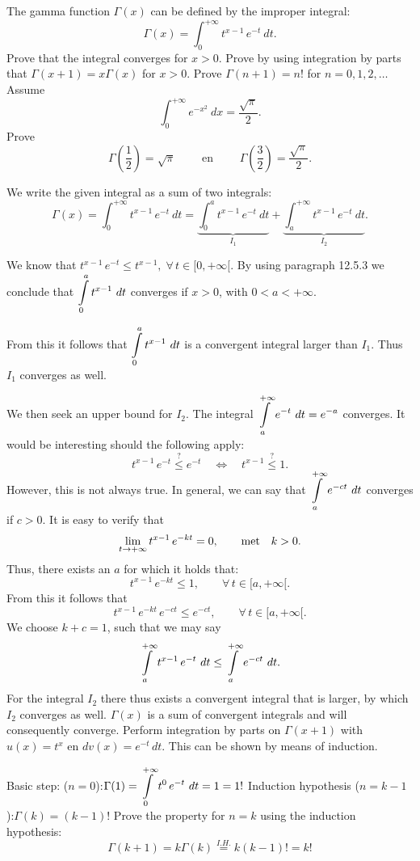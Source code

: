 \ifanalysis
\begin{Exercise}[difficulty = 3]
The gamma function $\Gamma(x)$ can be defined by the improper integral:
\[ \Gamma(x) = \int_0^{+\infty} t^{x-1}\, e^{-t}\ dt. \]
	\Question Prove that the integral converges for $x>0$.
	\Question Prove by using integration by parts that $\Gamma(x+1) = x\Gamma(x)$ for $x>0$.
	\Question Prove $\Gamma(n+1)=n!$ for $n=0,1,2,\ldots$
	\Question Assume
	\[ \int_0^{+\infty} e^{-x^2}\ dx = \dfrac{\sqrt{\pi}}{2}. \]
	Prove
	\[ \Gamma\left(\dfrac{1}{2}\right) = \sqrt{\pi}\qquad \text{ en }\qquad \Gamma\left(\dfrac{3}{2}\right) = \dfrac{\sqrt{\pi}}{2}. \]
\end{Exercise}

\begin{Answer}
    
    \Question We write the given integral as a sum of two integrals:
    \[ \Gamma(x) = \int_0^{+\infty} t^{x-1}\, e^{-t}\ dt = \underbrace{\int_0^{a} t^{x-1}\, e^{-t}\ dt}_{I_1} + \underbrace{\int_a^{+\infty} t^{x-1}\, e^{-t}\ dt}_{I_2} . \]
    
     We know that $t^{x-1}\, e^{-t} \leq t^{x-1},\; \forall\, t\in [0,+\infty[$. By using paragraph 12.5.3 we conclude that $\displaystyle \int \limits_0^{a} t^{x-1}\ dt$ converges if $x>0$, with $0<a<+\infty$.
    
    From this it follows that $\displaystyle \int \limits_0^{a} t^{x-1}\ dt$ is a convergent integral larger than $I_1$. Thus $I_1$ converges as well.
    \par
    We then seek an upper bound for $I_2$. The integral $\displaystyle \int \limits_a^{+\infty} e^{-t}\ dt = e^{-a}$ converges. It would be interesting should the following apply:
    \[ t^{x-1}\, e^{-t} \stackrel{?}{\leq} e^{-t}\quad \Leftrightarrow\quad t^{x-1}\stackrel{?}{\leq} 1.\]
    However, this is not always true. In general, we can say that $\displaystyle\int \limits_a^{+\infty} e^{-ct}\ dt$ converges if $c>0$. It is easy to verify that
    \[ \displaystyle\lim_{t\to +\infty} t^{x-1}\, e^{-kt} = 0,\qquad\mbox{met}\quad k>0.\]  
    Thus, there exists an $a$ for which it holds  that:
    \[ t^{x-1}\, e^{-kt} \leq 1,\qquad \forall\, t\in [a,+\infty[.\]
    From this it follows that
    \[t^{x-1}\, e^{-kt}\, e^{-ct} \leq e^{-ct},\qquad \forall\, t\in [a,+\infty[.\]
    We  choose $k+c=1$, such that we may say
    \[\displaystyle \int\limits_a^{+\infty} t^{x-1}\, e^{-t}\ dt \leq \displaystyle \int\limits_a^{+\infty} e^{-ct}\ dt. \]
    For the integral $I_2$ there thus exists a convergent integral that is larger, by which $I_2$ converges as well. $\Gamma(x)$ is a sum of convergent integrals and will consequently converge.
    \Question  Perform integration by parts on $\Gamma(x+1)$ with $u(x)=t^x$ en $dv(x)=e^{-t}\, dt$.
    \Question This can be shown by means of induction. 
    \begin{itemize}
    \Question Basic step: ($n=0$):\quad $\Gamma(1) = \displaystyle \int \limits_0^{+\infty} t^{0}\, e^{-t}\ dt =1 =1!$
    \Question Induction hypothesis ($n=k-1$):\quad $\Gamma(k)=(k-1)!$
    \Question Prove the property for $n=k$ using the induction hypothesis: 
    $$\Gamma(k+1) = k\Gamma(k) \stackrel{I.H.}{=} k (k-1)! = k!$$
    \end{itemize}
    

\end{Answer}
